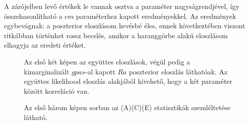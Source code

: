 A zárójelben levő értékek le vannak osztva a paraméter nagyságrendjével, így összehasonlítható a $cm$ paraméterhez kapott eredményekkel. Az eredmények egybevágnak: a poszterior eloszlásom kevésbé éles, ennek következtében viszont ritkábban történhet rossz becslés, amikor a haranggörbe alakú eloszlásom elhagyja az eredeti értéket. 

\begin{figure}
	\hfill
	\hfill
	\hfill
	\vfill
	\caption[Kétkompartmentum, színes zaj, két paraméter inferencia]{Az első két képen az együttes eloszlások, végül pedig a kimarginalizált $gpas$-al kapott $Ra$ poszterior eloszlás láthatóak. Az együttes likelihood eloszlás alakjából kivehető, hogy a két paraméter között korreláció van.}%
	\label{fig:cn2}
\end{figure}

\begin{figure}
	\hfill
	\hfill
	\hfill
	\vfill
	\caption[Kétkompartmentumos, színes zaj, két paraméter statisztika]{Az első három képen sorban az (A)(C)(E) statisztikák szemléltetése látható.}%
	\label{fig:cn2-stat}
\end{figure}








\FloatBarrier
